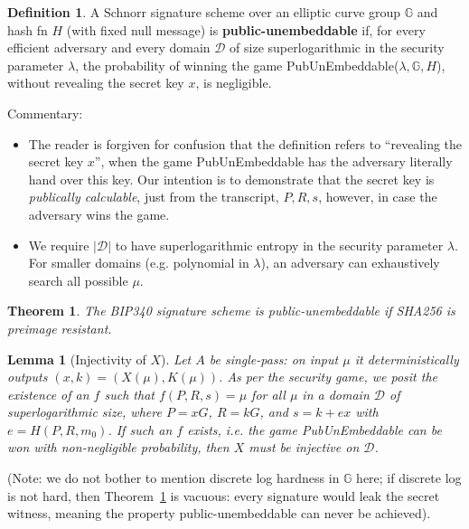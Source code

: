 \documentclass[10pt,a4paper]{article}
\newtheorem{theorem}{Theorem}
\newtheorem{lemma}{Lemma}       %
\theoremstyle{definition}   %
\newtheorem{definition}{Definition}
\theoremstyle{remark}       %
\newcommand{\G}{\mathbb{G}}
\begin{document}
\begin{definition}
A Schnorr signature scheme over an elliptic curve group $\G$ and hash fn $H$ (with fixed null message) is \textbf{public-unembeddable} if, for every efficient adversary and every domain $\mathcal{D}$ of size superlogarithmic in the security parameter $\lambda$, the probability of winning the game PubUnEmbeddable($\lambda, \G, H$), without revealing the secret key $x$, is negligible.
\end{definition}

Commentary:

\begin{itemize}
\item The reader is forgiven for confusion that the definition refers to ``revealing the secret key $x$'', when the game PubUnEmbeddable has the adversary literally hand over this key. Our intention is to demonstrate that the secret key is \emph{publically calculable}, just from the transcript, $P, R, s$, however, in case the adversary wins the game.
\item We require $|\mathcal{D}|$ to have superlogarithmic entropy in the security parameter $\lambda$. For smaller domains (e.g. polynomial in $\lambda$), an adversary can exhaustively search all possible $\mu$.
\end{itemize}

\begin{theorem}
\label{thm:pubunembedthm}
The BIP340 signature scheme is public-unembeddable if SHA256 is preimage resistant.
\end{theorem}


\begin{lemma}[Injectivity of $X$]
\label{lem:Xinjective}
Let $A$ be single-pass: on input $\mu$ it deterministically outputs
$(x,k) = (X(\mu),K(\mu))$. As per the security game, we posit the existence of an $f$ such that
$f(P,R,s)=\mu$ for all $\mu$ in a domain $\mathcal{D}$ of superlogarithmic size,
where $P=xG$, $R=kG$, and $s=k+ex$ with $e=H(P, R, m_0)$.
If such an $f$ exists, i.e. the game PubUnEmbeddable can be won with non-negligible probability, then $X$ must be injective on $\mathcal{D}$.
\end{lemma}

(Note: we do not bother to mention discrete log hardness in $\G$ here; if discrete log is not hard, then Theorem~\ref{thm:pubunembedthm} is vacuous: every signature would leak the secret witness, meaning the property public-unembeddable can never be achieved).
\end{document}
